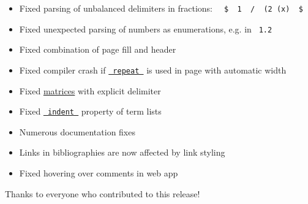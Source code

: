 \begin{itemize}
\begin{itemize}
  \item
    Fixed parsing of unbalanced delimiters in fractions:
    \texttt{\ }{\texttt{\ \$\ }}\texttt{\ 1\ }{\texttt{\ /\ }}\texttt{\ (2\ (x)\ }{\texttt{\ \$\ }}\texttt{\ }
  \item
    Fixed unexpected parsing of numbers as enumerations, e.g. in
    \texttt{\ 1.2\ }
  \item
    Fixed combination of page fill and header
  \item
    Fixed compiler crash if
    \href{/docs/reference/layout/repeat/}{\texttt{\ repeat\ }} is used
    in page with automatic width
  \item
    Fixed \href{/docs/reference/math/mat/}{matrices} with explicit
    delimiter
  \item
    Fixed
    \href{/docs/reference/model/terms/\#parameters-indent}{\texttt{\ indent\ }}
    property of term lists
  \item
    Numerous documentation fixes
  \item
    Links in bibliographies are now affected by link styling
  \item
    Fixed hovering over comments in web app
  \end{itemize}
\end{itemize}

Thanks to everyone who contributed to this release!

